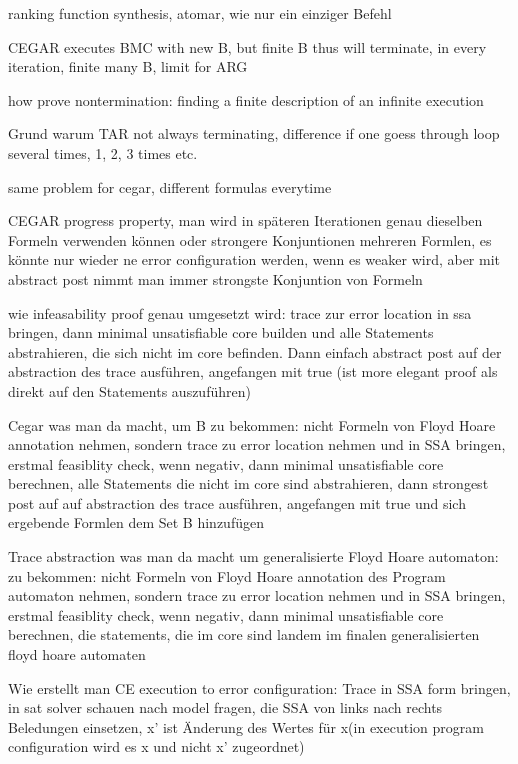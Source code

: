\documentclass[landscape, a4paper]{article}
\begin{document}
\begin{minipage}[t]{0.2\linewidth}
\begin{betterlist}
		\item ranking function synthesis, atomar, wie nur ein einziger Befehl
		\item CEGAR executes BMC with new B, but finite B thus will terminate, in every iteration, finite many B, limit for ARG
		\item how prove nontermination: finding a finite description of an infinite execution
		\item Grund warum TAR not always terminating, difference if one goess through loop several times, 1, 2, 3 times etc.
		\begin{betterlist}
			\item same problem for cegar, different formulas everytime
		\end{betterlist}
    \item CEGAR progress property, man wird in späteren Iterationen genau dieselben Formeln verwenden können oder strongere Konjuntionen mehreren Formlen, es könnte nur wieder ne error configuration werden, wenn es weaker wird, aber mit abstract post nimmt man immer strongste Konjuntion von Formeln
		\item \alert{wie infeasability proof genau umgesetzt wird:} trace zur error location in ssa bringen, dann minimal unsatisfiable core builden und alle Statements abstrahieren, die sich nicht im core befinden. Dann einfach abstract post auf der abstraction des trace ausführen, angefangen mit true (ist more elegant proof als direkt auf den Statements auszuführen)
		\item \alert{Cegar was man da macht, um B zu bekommen:} nicht Formeln von Floyd Hoare annotation nehmen, sondern trace zu error location nehmen und in SSA bringen, erstmal feasiblity check, wenn negativ, dann minimal unsatisfiable core berechnen, alle Statements die nicht im core sind abstrahieren, dann strongest post auf auf abstraction des trace ausführen, angefangen mit true und sich ergebende Formlen dem Set B hinzufügen
		\item \alert{Trace abstraction was man da macht um generalisierte Floyd Hoare automaton:} zu bekommen: nicht Formeln von Floyd Hoare annotation des Program automaton nehmen, sondern trace zu error location nehmen und in SSA bringen, erstmal feasiblity check, wenn negativ, dann minimal unsatisfiable core berechnen, die statements, die im core sind landem im finalen generalisierten floyd hoare automaten
		\item \alert{Wie erstellt man CE execution to error configuration:} Trace in SSA form bringen, in sat solver schauen nach model fragen, die SSA von links nach rechts Beledungen einsetzen, x' ist Änderung des Wertes für x(in execution program configuration wird es x und  nicht x' zugeordnet)

\end{betterlist}
\end{minipage}
\end{document}
